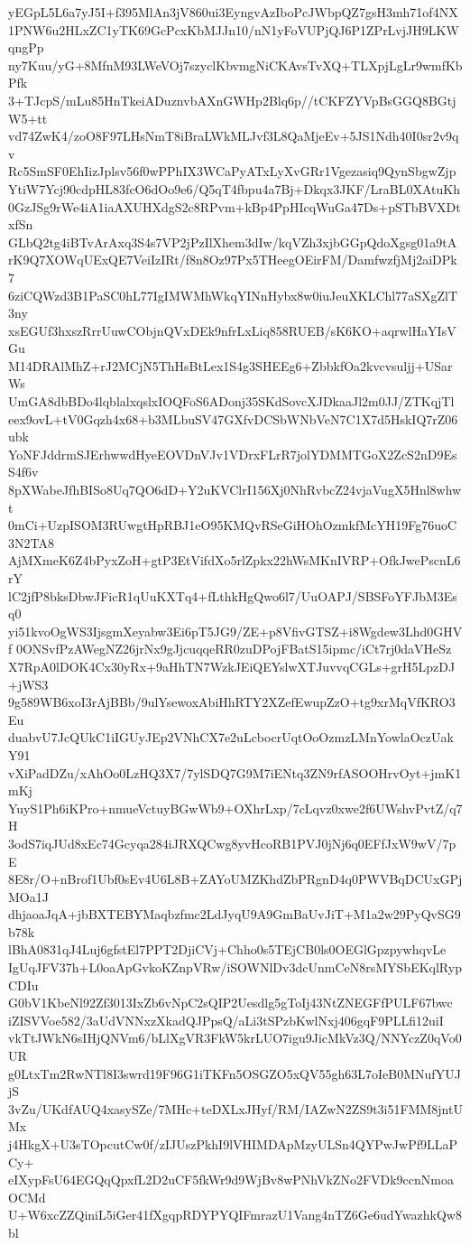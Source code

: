 yEGpL5L6a7yJ5I+f395MlAn3jV860ui3EyngvAzIboPcJWbpQZ7gsH3mh71of4NX
1PNW6u2HLxZC1yTK69GcPcxKbMJJn10/nN1yFoVUPjQJ6P1ZPrLvjJH9LKWqngPp
ny7Kuu/yG+8MfnM93LWeVOj7szyclKbvmgNiCKAvsTvXQ+TLXpjLgLr9wmfKbPfk
3+TJcpS/mLu85HnTkeiADuznvbAXnGWHp2Blq6p//tCKFZYVpBsGGQ8BGtjW5+tt
vd74ZwK4/zoO8F97LHsNmT8iBraLWkMLJvf3L8QaMjeEv+5JS1Ndh40I0sr2v9qv
Rc5SmSF0EhIizJplsv56f0wPPhIX3WCaPyATxLyXvGRr1Vgezasiq9QynSbgwZjp
YtiW7Ycj90cdpHL83fcO6dOo9e6/Q5qT4fbpu4a7Bj+Dkqx3JKF/LraBL0XAtuKh
0GzJSg9rWe4iA1iaAXUHXdgS2c8RPvm+kBp4PpHIcqWuGa47Ds+pSTbBVXDtxfSn
GLbQ2tg4iBTvArAxq3S4s7VP2jPzIlXhem3dIw/kqVZh3xjbGGpQdoXgsg01a9tA
rK9Q7XOWqUExQE7VeiIzIRt/f8n8Oz97Px5THeegOEirFM/DamfwzfjMj2aiDPk7
6ziCQWzd3B1PaSC0hL77IgIMWMhWkqYINnHybx8w0iuJeuXKLChl77aSXgZlT3ny
xsEGUf3hxszRrrUuwCObjnQVxDEk9nfrLxLiq858RUEB/sK6KO+aqrwlHaYIsVGu
M14DRAlMhZ+rJ2MCjN5ThHsBtLex1S4g3SHEEg6+ZbbkfOa2kvcvsuljj+USarWs
UmGA8dbBDo4lqblalxqslxIOQFoS6ADonj35SKdSovcXJDkaaJl2m0JJ/ZTKqjTl
eex9ovL+tV0Gqzh4x68+b3MLbuSV47GXfvDCSbWNbVeN7C1X7d5HskIQ7rZ06ubk
YoNFJddrmSJErhwwdHyeEOVDnVJv1VDrxFLrR7jolYDMMTGoX2ZcS2nD9EsS4f6v
8pXWabeJfhBISo8Uq7QO6dD+Y2uKVClrI156Xj0NhRvbcZ24vjaVugX5Hnl8whwt
0mCi+UzpISOM3RUwgtHpRBJ1eO95KMQvRSeGiHOhOzmkfMcYH19Fg76uoC3N2TA8
AjMXmeK6Z4bPyxZoH+gtP3EtVifdXo5rlZpkx22hWsMKnIVRP+OfkJwePscnL6rY
lC2jfP8bksDbwJFicR1qUuKXTq4+fLthkHgQwo6l7/UuOAPJ/SBSFoYFJbM3Esq0
yi51kvoOgWS3IjsgmXeyabw3Ei6pT5JG9/ZE+p8VfivGTSZ+i8Wgdew3Lhd0GHVf
0ONSvfPzAWegNZ26jrNx9gJjcuqqeRR0zuDPojFBatS15ipmc/iCt7rj0daVHeSz
X7RpA0lDOK4Cx30yRx+9aHhTN7WzkJEiQEYslwXTJuvvqCGLs+grH5LpzDJ+jWS3
9g589WB6xoI3rAjBBb/9ulYsewoxAbiHhRTY2XZefEwupZzO+tg9xrMqVfKRO3Eu
duabvU7JcQUkC1iIGUyJEp2VNhCX7e2uLcbocrUqtOoOzmzLMnYowlaOczUakY91
vXiPadDZu/xAhOo0LzHQ3X7/7ylSDQ7G9M7iENtq3ZN9rfASOOHrvOyt+jmK1mKj
YuyS1Ph6iKPro+nmueVctuyBGwWb9+OXhrLxp/7cLqvz0xwe2f6UWshvPvtZ/q7H
3odS7iqJUd8xEc74Gcyqa284iJRXQCwg8yvHcoRB1PVJ0jNj6q0EFfJxW9wV/7pE
8E8r/O+nBrof1Ubf0sEv4U6L8B+ZAYoUMZKhdZbPRgnD4q0PWVBqDCUxGPjMOa1J
dhjaoaJqA+jbBXTEBYMaqbzfmc2LdJyqU9A9GmBaUvJiT+M1a2w29PyQvSG9b78k
lBhA0831qJ4Luj6gfstEl7PPT2DjiCVj+Chho0s5TEjCB0ls0OEGlGpzpywhqvLe
IgUqJFV37h+L0oaApGvkoKZnpVRw/iSOWNlDv3dcUnmCeN8rsMYSbEKqlRypCDIu
G0bV1KbeNl92Zf3013IxZb6vNpC2sQIP2Uesdlg5gToIj43NtZNEGFfPULF67bwc
iZISVVoe582/3aUdVNNxzXkadQJPpsQ/aLi3tSPzbKwlNxj406gqF9PLLfi12uiI
vkTtJWkN6sIHjQNVm6/bLlXgVR3FkW5krLUO7igu9JicMkVz3Q/NNYczZ0qVo0UR
g0LtxTm2RwNTl8I3swrd19F96G1iTKFn5OSGZO5xQV55gh63L7oIeB0MNufYUJjS
3vZu/UKdfAUQ4xasySZe/7MHc+teDXLxJHyf/RM/IAZwN2ZS9t3i51FMM8jntUMx
j4HkgX+U3sTOpcutCw0f/zIJUszPkhI9lVHIMDApMzyULSn4QYPwJwPf9LLaPCy+
eIXypFsU64EGQqQpxfL2D2uCF5fkWr9d9WjBv8wPNhVkZNo2FVDk9ccnNmoaOCMd
U+W6xcZZQiniL5iGer41fXgqpRDYPYQIFmrazU1Vang4nTZ6Ge6udYwazhkQw8bl
